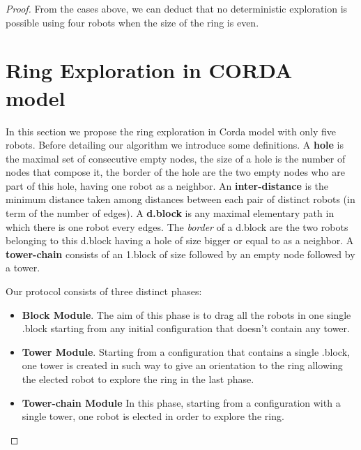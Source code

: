 \documentclass[12pt]{llncs}
\begin{document}
\begin{proof}
From the cases above, we can deduct that no  deterministic exploration is possible using four robots when the size of the ring is even.






\section{Ring Exploration in CORDA model}\label{sec:Exp}
In this section we propose the ring exploration in Corda model with only five robots. Before detailing our algorithm we introduce some definitions. A {\bf hole} is the maximal set of consecutive empty nodes, the size of a hole is the number of nodes that compose it, the border of the hole are the two empty nodes who are part of this hole, having one robot as a neighbor. An {\bf inter-distance}  is the minimum distance taken among distances between each pair of distinct robots (in term of the number of edges). A {\bf d.block} is any maximal elementary path in which there is one robot every  edges. The {\it border} of a d.block are the two robots belonging to this d.block having a hole of size bigger or equal to  as a neighbor. A {\bf tower-chain} consists of an 1.block of size  followed by an empty node followed by a tower.

\label{sec:Overview}
Our protocol consists of three distinct phases:
\begin{itemize}
\item{\textbf{Block Module}. The aim of this phase is to drag all the robots in one single .block starting from any initial configuration that doesn't contain any tower.}

\item{\textbf{Tower Module}. Starting from a configuration that contains a single .block, one tower is created in such way to give an orientation to the ring  allowing the elected robot to explore the ring in the last phase.}

\item{\textbf{Tower-chain Module} In this phase, starting from a configuration with a single tower, one robot is elected in order to explore the ring. 
}
\end{itemize}


\end{proof}
\end{document}
